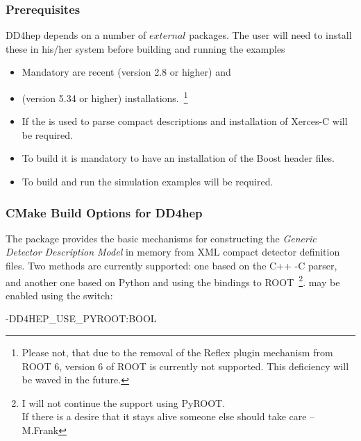 \documentclass[10pt,a4paper]{article}
\begin{document}
\subsubsection{Prerequisites}
\label{sec:dd4hep-user-manual-prerequisites}
\noindent
DD4hep depends on a number of $external$ packages. 
The user will need to install these in his/her 
system before building and running the examples
\begin{itemize}\itemcompact
\item Mandatory are recent  (version 2.8 or higher) and 
\item {} (version 5.34 or higher) installations.~\footnote{Please 
not, that due to the removal of the Reflex plugin mechanism from ROOT 6,
version 6 of ROOT is currently not supported. This deficiency will be waved 
in the future.}
\item If the  is used to parse compact descriptions and 
        installation of {Xerces-C} will be required.
\item To build \DDG it is mandatory to have an installation of the Boost
    header files.
\item To build and run the simulation examples  will be required. 
\end{itemize}

\newpage
\subsubsection{CMake Build Options for DD4hep}
\label{sec:dd4hep-user-manual-building}
\noindent
The package provides the basic mechanisms for constructing the 
{\it{Generic Detector Description Model}} in memory from XML compact detector 
definition files. Two methods are currently supported: one based
on the C++ -C parser, and another one based on Python and using the 
 bindings to ROOT~\footnote{I will not continue 
the support using PyROOT. \\
If there is a desire that it stays alive 
someone else should take care -- M.Frank}. 
 may be enabled using the switch:

\begin{unnumberedcode}
    -DD4HEP_USE_PYROOT:BOOL
\end{unnumberedcode}
\end{document}
